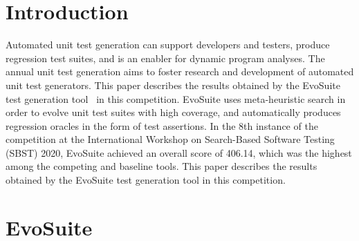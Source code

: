 \documentclass[sigconf]{acmart}
\newcommand{\EVOSUITE}{{\sc EvoSuite}\xspace}
\newcommand{\TOTALPOINTS}{{406.14}\xspace}
\begin{document}
\maketitle

\section{Introduction}


Automated unit test generation can support developers and testers, produce
regression test suites, and is an enabler for dynamic program analyses. The
annual unit test generation aims to foster research and development of
automated unit test generators. This paper describes the results obtained by
the \EVOSUITE test generation tool~\cite{FrA11c} in this competition. \EVOSUITE
uses meta-heuristic search in order to evolve unit test suites with high
coverage, and automatically produces regression oracles in the form of test
assertions. In the 8th instance of the competition at the International
Workshop on Search-Based Software Testing (SBST) 2020, \EVOSUITE achieved an
overall score of \TOTALPOINTS, which was the highest among the competing and
baseline tools. This paper describes the results obtained by the \EVOSUITE test
generation tool in this competition.



\section{\EVOSUITE}
\end{document}
